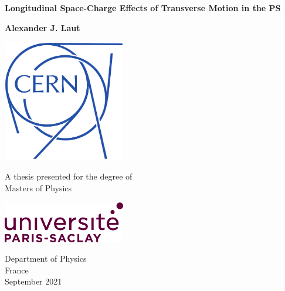 \begin{titlepage}
    \centering
    \vspace*{1cm}
        
    \Huge
    \textbf{Longitudinal Space-Charge Effects of Transverse Motion in the PS}
        
    \vspace{0.5cm}
    \LARGE
        
    \vspace{1.5cm}
        
    \textbf{Alexander J. Laut}
        
    \vfill
        
    \includegraphics[width=0.4\textwidth]{logos/LogoOutline-Bleu.pdf}
    \vfill
    
    A thesis presented for the degree of\\
    Masters of Physics
    
    \vspace{0.8cm}
        
    \includegraphics[width=0.4\textwidth]{logos/logo.png}
    
    \Large
    Department of Physics\\
    France\\
    September 2021
    
\end{titlepage}

